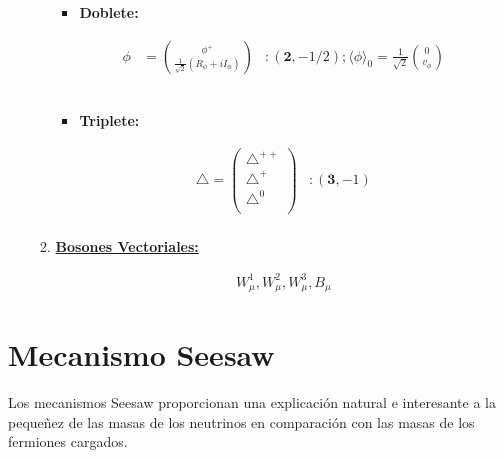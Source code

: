 \documentclass[12pt]{article}
\begin{document}
\begin{enumerate}
\begin{enumerate}
\begin{itemize}
\item \textbf{Doblete:}
\end{itemize}

\begin{equation}
\begin{aligned}
      \phi & = \binom{\phi^{+}}{\frac{1}{\sqrt{2}}(R_\phi+iI_\phi )}& :  (\textbf{2}, -1/2);  \langle  \phi \rangle_0 = \frac{1}{\sqrt{2}}  \binom{0}{v_\phi} 
\end{aligned}
\end{equation} \\

\begin{itemize}
\item \textbf{Triplete:}
\end{itemize}

\begin{equation}
\begin{aligned}
 \triangle= \begin{pmatrix} \triangle^{++}   \\ \triangle^{+}  \\  \triangle^{0} \\ \end{pmatrix} & :  (\textbf{3}, -1) \\ 
\end{aligned}
\end{equation}


\item\underline{ \textbf{Bosones Vectoriales:}}


\begin{equation}
\begin{aligned}
 W_\mu^{1}, W_\mu^{2}, W_\mu^{3}, B_\mu 
\end{aligned}
\end{equation}
\end{enumerate}
\end{enumerate}


\section{Mecanismo Seesaw}

Los mecanismos Seesaw proporcionan una explicación natural e interesante a la pequeñez de las masas de los neutrinos en comparación
con las masas de los fermiones cargados. 
\end{document}
